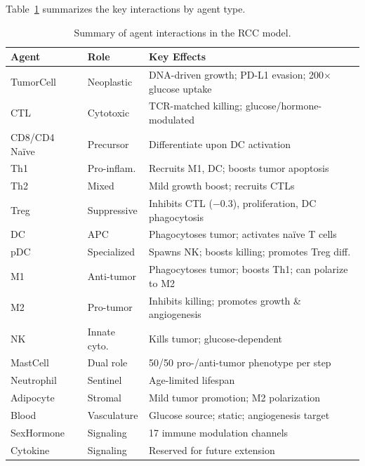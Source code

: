Table~\ref{tab:interactions} summarizes the key interactions by agent type.

\begin{table}[htbp]
\centering
\caption{Summary of agent interactions in the RCC model.}
\label{tab:interactions}
{\small
\begin{tabular}{@{}llp{6.5cm}@{}}
\toprule
\textbf{Agent} & \textbf{Role} & \textbf{Key Effects} \\
\midrule
TumorCell       & Neoplastic     & DNA-driven growth; PD-L1 evasion; 200$\times$ glucose uptake \\
CTL             & Cytotoxic      & TCR-matched killing; glucose/hormone-modulated \\
CD8/CD4 Na\"ive & Precursor      & Differentiate upon DC activation \\
Th1             & Pro-inflam.    & Recruits M1, DC; boosts tumor apoptosis \\
Th2             & Mixed          & Mild growth boost; recruits CTLs \\
Treg            & Suppressive    & Inhibits CTL ($-0.3$), proliferation, DC phagocytosis \\
DC              & APC            & Phagocytoses tumor; activates na\"ive T cells \\
pDC             & Specialized    & Spawns NK; boosts killing; promotes Treg diff. \\
M1              & Anti-tumor     & Phagocytoses tumor; boosts Th1; can polarize to M2 \\
M2              & Pro-tumor      & Inhibits killing; promotes growth \& angiogenesis \\
NK              & Innate cyto.   & Kills tumor; glucose-dependent \\
MastCell        & Dual role      & 50/50 pro-/anti-tumor phenotype per step \\
Neutrophil      & Sentinel       & Age-limited lifespan \\
Adipocyte       & Stromal        & Mild tumor promotion; M2 polarization \\
Blood           & Vasculature    & Glucose source; static; angiogenesis target \\
SexHormone      & Signaling      & 17 immune modulation channels \\
Cytokine        & Signaling      & Reserved for future extension \\
\bottomrule
\end{tabular}
}
\end{table}

